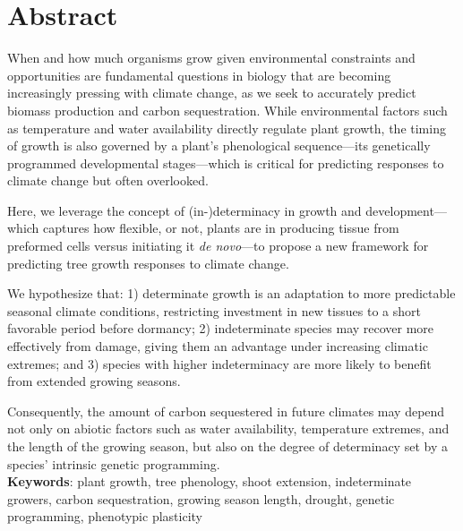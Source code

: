 \documentclass{article}
\begin{document}
	
\section*{Abstract} %
	When and how much organisms grow given environmental constraints and opportunities are fundamental questions in biology that are becoming increasingly pressing with climate change, as we seek to accurately predict biomass production and carbon sequestration. 
	While environmental factors such as temperature and water availability directly regulate plant growth, the timing of growth is also governed by a plant’s phenological sequence—its genetically programmed developmental stages—which is critical for predicting responses to climate change but often overlooked. 
	
	Here, we leverage the concept of (in-)determinacy in growth and development---which captures how flexible, or not, plants are in 
	producing tissue from preformed cells versus initiating it \textit{de novo}—to propose a new framework for predicting tree growth responses to climate change.
	
	We hypothesize that: 1) determinate growth is an adaptation to more predictable seasonal climate conditions, restricting investment in new tissues to a short favorable period before dormancy; 2) indeterminate species may recover more effectively from damage, giving them an advantage under increasing climatic extremes; and 3) species with higher indeterminacy are more likely to benefit from extended growing seasons. 
	
	Consequently, the amount of carbon sequestered in future climates may depend not only on abiotic factors such as water availability, temperature extremes, and the length of the growing season, but also on the degree of determinacy set by a species' intrinsic genetic programming.\\
		
			\textbf{Keywords}: plant growth, tree phenology, shoot extension, indeterminate growers, carbon sequestration, growing season length, drought, genetic programming, phenotypic plasticity
			\newpage
			
\end{document}
